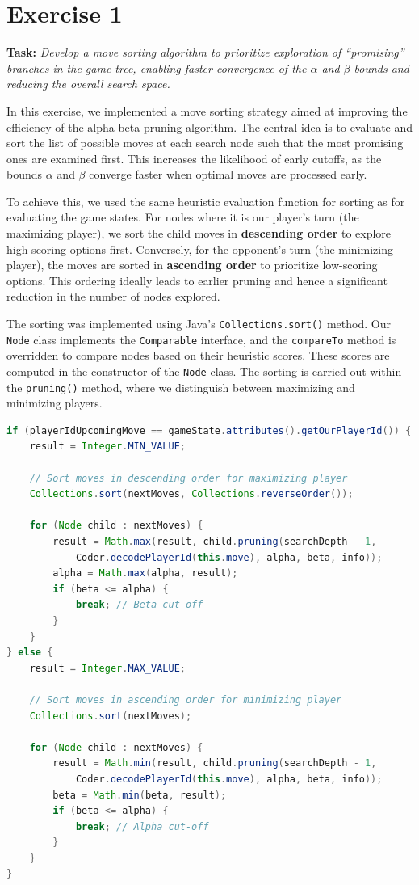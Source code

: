 \section*{Exercise 1}

\textbf{Task:} \textit{Develop a move sorting algorithm to prioritize exploration of “promising” branches in the game tree, enabling faster convergence of the $\alpha$ and $\beta$ bounds and reducing the overall search space.}

\medskip

\noindent In this exercise, we implemented a move sorting strategy aimed at improving the efficiency of the alpha-beta pruning algorithm. The central idea is to evaluate and sort the list of possible moves at each search node such that the most promising ones are examined first. This increases the likelihood of early cutoffs, as the bounds $\alpha$ and $\beta$ converge faster when optimal moves are processed early.

To achieve this, we used the same heuristic evaluation function for sorting as for evaluating the game states. For nodes where it is our player’s turn (the maximizing player), we sort the child moves in \textbf{descending order} to explore high-scoring options first. Conversely, for the opponent's turn (the minimizing player), the moves are sorted in \textbf{ascending order} to prioritize low-scoring options. This ordering ideally leads to earlier pruning and hence a significant reduction in the number of nodes explored.

The sorting was implemented using Java’s \texttt{Collections.sort()} method. Our \texttt{Node} class implements the \texttt{Comparable} interface, and the \texttt{compareTo} method is overridden to compare nodes based on their heuristic scores. These scores are computed in the constructor of the \texttt{Node} class. The sorting is carried out within the \texttt{pruning()} method, where we distinguish between maximizing and minimizing players.

\begin{lstlisting}[language=Java, basicstyle=\ttfamily\small]
if (playerIdUpcomingMove == gameState.attributes().getOurPlayerId()) {
    result = Integer.MIN_VALUE;

    // Sort moves in descending order for maximizing player
    Collections.sort(nextMoves, Collections.reverseOrder());

    for (Node child : nextMoves) {
        result = Math.max(result, child.pruning(searchDepth - 1,
            Coder.decodePlayerId(this.move), alpha, beta, info));
        alpha = Math.max(alpha, result);
        if (beta <= alpha) {
            break; // Beta cut-off
        }
    }
} else {
    result = Integer.MAX_VALUE;

    // Sort moves in ascending order for minimizing player
    Collections.sort(nextMoves);

    for (Node child : nextMoves) {
        result = Math.min(result, child.pruning(searchDepth - 1,
            Coder.decodePlayerId(this.move), alpha, beta, info));
        beta = Math.min(beta, result);
        if (beta <= alpha) {
            break; // Alpha cut-off
        }
    }
}
\end{lstlisting}

